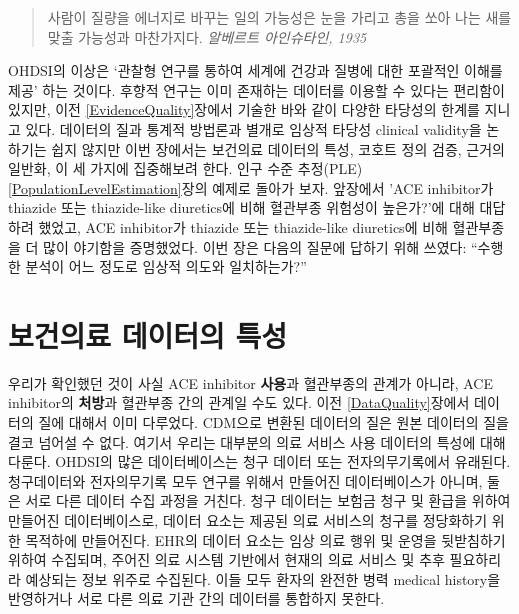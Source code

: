 \documentclass[10.5pt]{book}
\theoremstyle{definition}
\theoremstyle{definition}
\theoremstyle{definition}
\theoremstyle{remark}
\begin{document}
\begin{quote}
사람이 질량을 에너지로 바꾸는 일의 가능성은 눈을 가리고 총을 쏘아 나는
새를 맞출 가능성과 마찬가지다. \emph{알베르트 아인슈타인, 1935}
\end{quote}

OHDSI의 이상은 `관찰형 연구를 통하여 세계에 건강과 질병에 대한 포괄적인
이해를 제공' 하는 것이다. 후향적 연구는 이미 존재하는 데이터를 이용할 수
있다는 편리함이 있지만, 이전 \ref{EvidenceQuality}장에서 기술한 바와
같이 다양한 타당성의 한계를 지니고 있다. 데이터의 질과 통계적 방법론과
별개로 임상적 타당성 clinical validity을 논하기는 쉽지 않지만 이번
장에서는 보건의료 데이터의 특성, 코호트 정의 검증, 근거의 일반화, 이 세
가지에 집중해보려 한다. 인구 수준 추정(PLE)
\ref{PopulationLevelEstimation}장의 예제로 돌아가 보자. 앞장에서 'ACE
inhibitor가 thiazide 또는 thiazide-like diuretics에 비해 혈관부종
위험성이 높은가?'에 대해 대답하려 했었고, ACE inhibitor가 thiazide 또는
thiazide-like diuretics에 비해 혈관부종을 더 많이 야기함을 증명했었다.
이번 장은 다음의 질문에 답하기 위해 쓰였다: ``수행한 분석이 어느 정도로
임상적 의도와 일치하는가?'' 

\section{보건의료 데이터의 특성}\label{CharacteristicsOfDatabase}

우리가 확인했던 것이 사실 ACE inhibitor \textbf{사용}과 혈관부종의
관계가 아니라, ACE inhibitor의 \textbf{처방}과 혈관부종 간의 관계일 수도
있다. 이전 \ref{DataQuality}장에서 데이터의 질에 대해서 이미 다루었다.
CDM으로 변환된 데이터의 질은 원본 데이터의 질을 결코 넘어설 수 없다.
여기서 우리는 대부분의 의료 서비스 사용 데이터의 특성에 대해 다룬다.
OHDSI의 많은 데이터베이스는 청구 데이터 또는 전자의무기록에서 유래된다.
청구데이터와 전자의무기록 모두 연구를 위해서 만들어진 데이터베이스가
아니며, 둘은 서로 다른 데이터 수집 과정을 거친다. 청구 데이터는 보험금
청구 및 환급을 위하여 만들어진 데이터베이스로, 데이터 요소는 제공된 의료
서비스의 청구를 정당화하기 위한 목적하에 만들어진다. EHR의 데이터 요소는
임상 의료 행위 및 운영을 뒷받침하기 위하여 수집되며, 주어진 의료 시스템
기반에서 현재의 의료 서비스 및 추후 필요하리라 예상되는 정보 위주로
수집된다. 이들 모두 환자의 완전한 병력 medical history을 반영하거나 서로
다른 의료 기관 간의 데이터를 통합하지 못한다.
\end{document}
